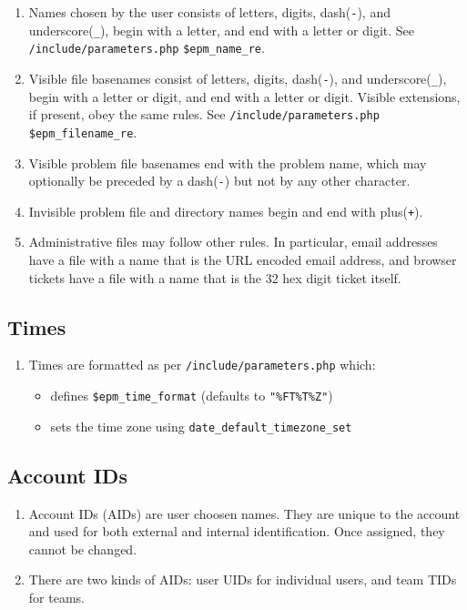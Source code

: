 \documentclass[12pt]{article}
\newcommand{\EOL}{\penalty \exhyphenpenalty}
\begin{document}
\begin{enumerate}
\item Names chosen by the user consists of letters, digits,
dash({\tt -}), and underscore({\tt \_}), begin with a letter,
and end with a letter or digit.
See {\tt /include/parameters.php} {\tt \$epm\_name\_re}.
\item Visible file basenames consist of letters, digits, dash({\tt -}), and
underscore({\tt \_}), begin with a letter or digit, and end
with a letter or digit.  Visible extensions, if present, obey the
same rules.  See {\tt /include/parameters.php} {\tt \$epm\_filename\_re}.
\item Visible problem file basenames end with the
      problem name, which may optionally be preceded by a dash({\tt -}) but
      not by any other character.
\item Invisible problem
      file and directory names begin and end with plus({\tt +}).
\item Administrative files may follow other rules.  In particular,
      email addresses have a file with a name that is the URL encoded email
      address, and browser tickets have a file with a name that is the
      32 hex digit ticket itself.
\end{enumerate}

\subsection{Times}

\begin{enumerate}
\item Times are formatted as per {\tt /include/parameters.php}
     which:
     \begin{itemize}
     \item defines {\tt \$epm\_time\_\EOL format}
           (defaults to {\tt "\%FT\%T\%Z"})
     \item sets the time zone using
           {\tt date\_default\_\EOL timezone\_\EOL set}
     \end{itemize}

\end{enumerate}

\subsection{Account IDs}

\begin{enumerate}
\item Account IDs (AIDs) are user choosen names.  They are unique to the
      account and used for both external and internal identification.
      Once assigned, they cannot be changed.
\item There are two kinds of AIDs: user UIDs for individual users,
      and team TIDs for teams.
\end{enumerate}
\end{document}
